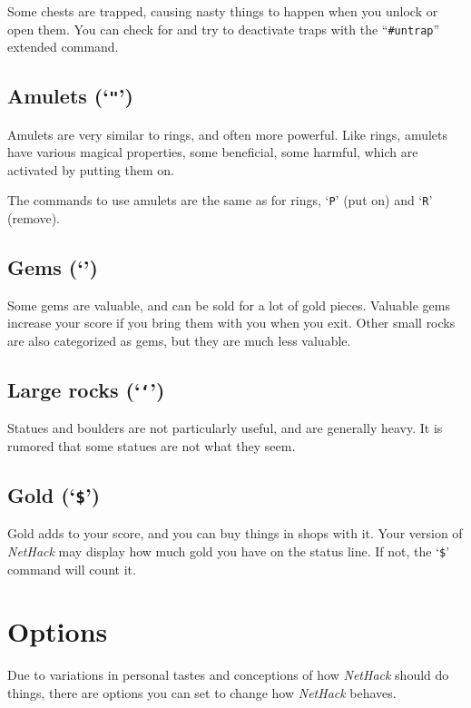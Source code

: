 Some chests are trapped, causing nasty things to happen when you
unlock or open them.  You can check for and try to deactivate traps
with the ``{\tt \#untrap}'' extended command.

\subsection*{Amulets (`{\tt "}')}

Amulets are very similar to rings, and often more powerful.  Like
rings, amulets have various magical properties, some beneficial,
some harmful, which are activated by putting them on.

The commands to use amulets are the same as for rings, `{\tt P}' (put on)
and `{\tt R}' (remove).

\subsection*{Gems (`{\tt *}')}

Some gems are valuable, and can be sold for a lot of gold pieces.
Valuable gems increase your score if you bring them with you when you
exit.  Other small rocks are also categorized as gems, but they are
much less valuable.

\subsection*{Large rocks (`{\tt `}')}
Statues and boulders are not particularly useful, and are generally
heavy.  It is rumored that some statues are not what they seem.

\subsection*{Gold (`{\tt \$}')}

Gold adds to your score, and you can buy things in shops with it.
Your version of {\it NetHack\/} may display how much gold you have on the
status line.  If not, the `{\tt \$}' command will count it.

\section{Options}

Due to variations in personal tastes and conceptions of how {\it NetHack\/}
should do things, there are options you can set to change how {\it NetHack\/}
behaves.

